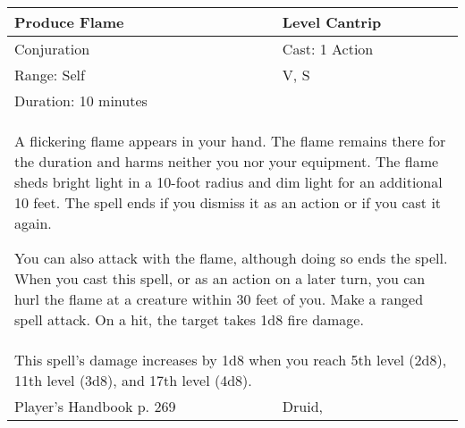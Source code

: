 \documentclass[11pt]{report}
\begin{document}
\begin{table}[H]
	\begin{tabular}{||p{6cm}|p{6cm}||}
		\hline\hline
		\bf{Produce Flame} & Level Cantrip\\ \hline
		Conjuration & Cast: 1 Action\\ \hline
		Range: Self & V, S\\ \hline
		Duration: 10 minutes & \\ \hline
		\multicolumn{2}{||p{12cm}||}{A flickering flame appears in your hand.
The flame remains there for the duration and harms neither you nor your equipment. The flame sheds bright light in a 10-foot radius and dim light for an additional 10 feet. The spell ends if you dismiss it as an action or if you cast it again.

You can also attack with the flame, although doing so ends the spell. When you cast this spell, or as an action on a later turn, you can hurl the flame at a creature within 30 feet of you. Make a ranged spell attack. On a hit, the target takes 1d8 fire damage.}\\ \hline
		\multicolumn{2}{||p{12cm}||}{This spell’s damage increases by 1d8 when you reach 5th level (2d8), 11th level (3d8), and 17th level (4d8).}\\ \hline
Player's Handbook p. 269 & Druid, \\ \hline\hline
	\end{tabular}
\end{table}
\end{document}
